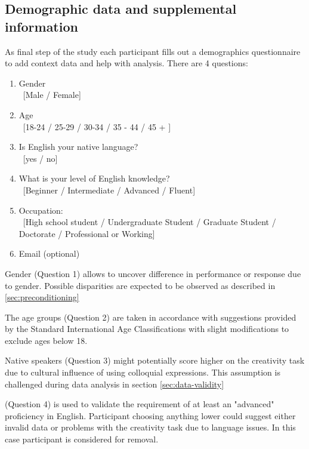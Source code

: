 	\subsection{Demographic data and supplemental information} \label{sec:demographics}
	
	As final step of the study each participant fills out a demographics questionnaire to add context data and help with analysis. There are 4 questions:
	
	\begin{enumerate}
		\item Gender \\ \ [Male / Female]
		\item Age \\ \ [18-24 / 25-29 / 30-34 / 35 - 44 / 45 + ]
		\item Is English your native language? \\ \ [yes / no]
		\item What is your level of English knowledge? \\ \
			[Beginner  / Intermediate / Advanced / Fluent]
		\item Occupation: \\ \ [High school student / Undergraduate Student / Graduate Student / Doctorate / Professional or Working]
		\item Email (optional)
	\end{enumerate}

	Gender (Question 1) allows to uncover difference in performance or response due to gender. Possible disparities are expected to be observed as described in \ref{sec:preconditioning}

	The age groups (Question 2) are taken in accordance with suggestions provided by the Standard International Age Classifications \cite{UN1982} with slight modifications to exclude ages below 18.
	
	
	Native speakers (Question 3) might potentially score higher on the creativity task due to cultural influence of using colloquial expressions. This assumption is challenged during data analysis in section \ref{sec:data-validity}
	
	(Question 4) is used to validate the requirement of at least an "advanced" proficiency in English. Participant choosing anything lower could suggest either invalid data or problems with the creativity task due to language issues. In this case participant is considered for removal. 
	
